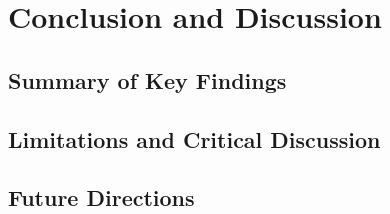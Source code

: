 \chapter{Conclusion and Discussion}
\section{Summary of Key Findings}
\section{Limitations and Critical Discussion}
\section{Future Directions}
